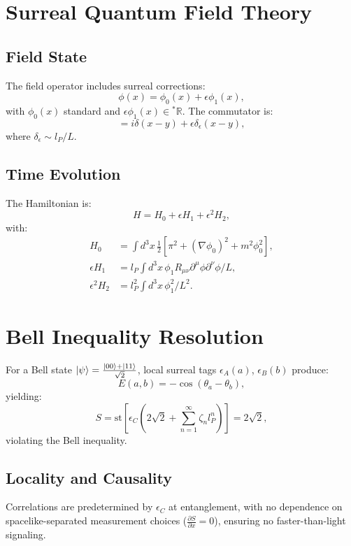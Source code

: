 \documentclass{article}
\begin{document}
\section{Surreal Quantum Field Theory}
\subsection{Field State}
The field operator includes surreal corrections:
\begin{equation}
\phi(x) = \phi_0(x) + \epsilon \phi_1(x),
\end{equation}
with \(\phi_0(x)\) standard and \(\epsilon \phi_1(x) \in {}^*\mathbb{R}\). The commutator is:
\begin{equation}
[\phi(x), \pi(y)] = i \delta(x-y) + \epsilon \delta_\epsilon(x-y),
\end{equation}
where \(\delta_\epsilon \sim l_P / L\).

\subsection{Time Evolution}
The Hamiltonian is:
\begin{equation}
H = H_0 + \epsilon H_1 + \epsilon^2 H_2,
\end{equation}
with:
\begin{align}
H_0 &= \int d^3x \, \frac{1}{2} [\pi^2 + (\nabla \phi_0)^2 + m^2 \phi_0^2], \\
\epsilon H_1 &= l_P \int d^3x \, \phi_1 R_{\mu\nu} \partial^\mu \phi \partial^\nu \phi / L, \\
\epsilon^2 H_2 &= l_P^2 \int d^3x \, \phi_1^2 / L^2.
\end{align}

\section{Bell Inequality Resolution}
For a Bell state \(\ket{\psi} = \frac{\ket{00} + \ket{11}}{\sqrt{2}}\), local surreal tags \(\epsilon_A(a)\), \(\epsilon_B(b)\) produce:
\begin{equation}
E(a,b) = -\cos(\theta_a - \theta_b),
\end{equation}
yielding:
\begin{equation}
S = \text{st}\left[ \epsilon_C \left(2\sqrt{2} + \sum_{n=1}^\infty \zeta_n l_P^n\right) \right] = 2\sqrt{2},
\end{equation}
violating the Bell inequality.

\subsection{Locality and Causality}
Correlations are predetermined by \(\epsilon_C\) at entanglement, with no dependence on spacelike-separated measurement choices (\(\frac{\partial S}{\partial x} = 0\)), ensuring no faster-than-light signaling.
\end{document}
